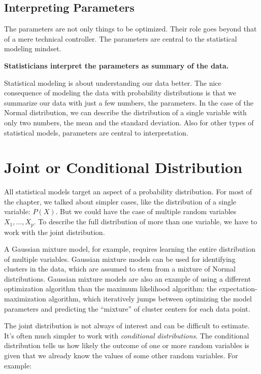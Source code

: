 \documentclass[
  10pt,
]{scrbook}
\begin{document}
\hypertarget{interpreting-parameters}{%
\subsection*{Interpreting Parameters}\label{interpreting-parameters}}


The parameters are not only things to be optimized.
Their role goes beyond that of a mere technical controller.
The parameters are central to the statistical modeling mindset.

\textbf{Statisticians interpret the parameters as summary of the data.}

Statistical modeling is about understanding our data better.
The nice consequence of modeling the data with probability distributions is that we summarize our data with just a few numbers, the parameters.
In the case of the Normal distribution, we can describe the distribution of a single variable with only two numbers, the mean and the standard deviation.
Also for other types of statistical models, parameters are central to interpretation.

\hypertarget{joint-or-conditional-distribution}{%
\section{Joint or Conditional Distribution}\label{joint-or-conditional-distribution}}

All statistical models target an aspect of a probability distribution.
For most of the chapter, we talked about simpler cases, like the distribution of a single variable: \(P(X)\).
But we could have the case of multiple random variables \(X_1, \ldots, X_p\).
To describe the full distribution of more than one variable, we have to work with the joint distribution.

A Gaussian mixture model, for example, requires learning the entire distribution of multiple variables.
Gaussian mixture models can be used for identifying clusters in the data, which are assumed to stem from a mixture of Normal distributions.
Gaussian mixture models are also an example of using a different optimization algorithm than the maximum likelihood algorithm: the expectation-maximization algorithm, which iteratively jumps between optimizing the model parameters and predicting the ``mixture'' of cluster centers for each data point.

The joint distribution is not always of interest and can be difficult to estimate.
It's often much simpler to work with \emph{conditional distributions}.
The conditional distribution tells us how likely the outcome of one or more random variables is given that we already know the values of some other random variables.
For example:
\end{document}
